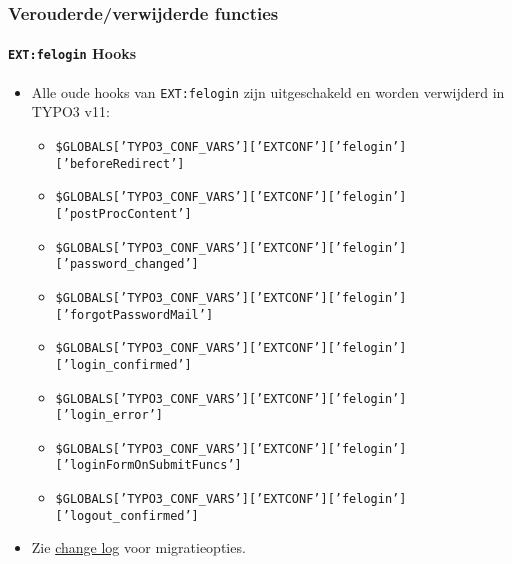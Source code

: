\begin{frame}[fragile]
	\frametitle{Verouderde/verwijderde functies}
	\framesubtitle{\texttt{EXT:felogin} Hooks}

	\lstset{basicstyle=\tiny\ttfamily}

	\begin{itemize}
		\item Alle oude hooks van \texttt{EXT:felogin} zijn uitgeschakeld en
			worden verwijderd in TYPO3 v11:

			\begin{itemize}\tiny
				\item \texttt{\$GLOBALS['TYPO3\_CONF\_VARS']['EXTCONF']['felogin']['beforeRedirect']}
				\item \texttt{\$GLOBALS['TYPO3\_CONF\_VARS']['EXTCONF']['felogin']['postProcContent']}
				\item \texttt{\$GLOBALS['TYPO3\_CONF\_VARS']['EXTCONF']['felogin']['password\_changed']}
				\item \texttt{\$GLOBALS['TYPO3\_CONF\_VARS']['EXTCONF']['felogin']['forgotPasswordMail']}
				\item \texttt{\$GLOBALS['TYPO3\_CONF\_VARS']['EXTCONF']['felogin']['login\_confirmed']}
				\item \texttt{\$GLOBALS['TYPO3\_CONF\_VARS']['EXTCONF']['felogin']['login\_error']}
				\item \texttt{\$GLOBALS['TYPO3\_CONF\_VARS']['EXTCONF']['felogin']['loginFormOnSubmitFuncs']}
				\item \texttt{\$GLOBALS['TYPO3\_CONF\_VARS']['EXTCONF']['felogin']['logout\_confirmed']}
			\end{itemize}

		\item Zie
			\href{https://docs.typo3.org/c/typo3/cms-core/master/en-us/Changelog/10.4/Deprecation-88740-DeprecateFeloginPibasePlugin.html}{change log}
			voor migratieopties.
	\end{itemize}

\end{frame}


